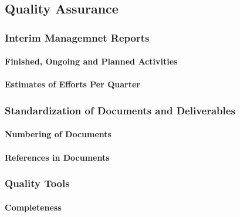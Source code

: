 \documentclass[
  11pt,
]{article}
\begin{document}
\hypertarget{quality-assurance-1}{%
\subsection{Quality Assurance}\label{quality-assurance-1}}

\hypertarget{interim-managemnet-reports}{%
\subsubsection{Interim Managemnet
Reports}\label{interim-managemnet-reports}}

\hypertarget{finished-ongoing-and-planned-activities}{%
\paragraph{Finished, Ongoing and Planned
Activities}\label{finished-ongoing-and-planned-activities}}

\hypertarget{estimates-of-efforts-per-quarter}{%
\paragraph{Estimates of Efforts Per
Quarter}\label{estimates-of-efforts-per-quarter}}

\hypertarget{standardization-of-documents-and-deliverables}{%
\subsubsection{Standardization of Documents and
Deliverables}\label{standardization-of-documents-and-deliverables}}

\hypertarget{numbering-of-documents}{%
\paragraph{Numbering of Documents}\label{numbering-of-documents}}

\hypertarget{references-in-documents}{%
\paragraph{References in Documents}\label{references-in-documents}}

\hypertarget{quality-tools}{%
\subsubsection{Quality Tools}\label{quality-tools}}

\hypertarget{completeness}{%
\paragraph{Completeness}\label{completeness}}
\end{document}
